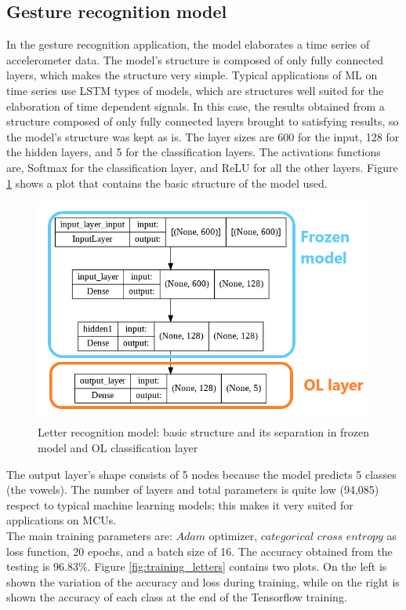 \documentclass[12pt]{report}
\begin{document}
\subsection{Gesture recognition model}
In the gesture recognition application, the model elaborates a time series of accelerometer data. The model's structure is composed of only fully connected layers, which makes the structure very simple. Typical applications of ML on time series use LSTM types of models, which are structures well suited for the elaboration of time dependent signals. In this case, the results obtained from a structure composed of only fully connected layers brought to satisfying results, so the model's structure was kept as is. The layer sizes are 600 for the input, 128 for the hidden layers, and 5 for the classification layers. The activations functions are, Softmax for the classification layer, and ReLU for all the other layers. Figure \ref{fig:letter_structure} shows a plot that contains the basic structure of the model used.\\

\begin{figure}[h!]
    \centering
    \includegraphics[width=120mm]{Figures/Chapter4/letter_structure.png} 
    \caption{Letter recognition model: basic structure and its separation in frozen model and OL classification layer}
    \label{fig:letter_structure}    
\end{figure}

The output layer's shape consists of 5 nodes because the model predicts 5 classes (the vowels). The number of layers and total parameters is quite low (94,085) respect to typical machine learning models; this makes it very suited for applications on MCUs. \\
The main training parameters are: $Adam$ optimizer, $categorical$ $cross$ $entropy$ as loss function, 20 epochs, and a batch size of 16. 
The accuracy obtained from the testing is 96.83\%. Figure \ref{fig:training_letters} contains two plots. On the left is shown the variation of the accuracy and loss during training, while on the right is shown the accuracy of each class at the end of the Tensorflow training.\\
\end{document}
